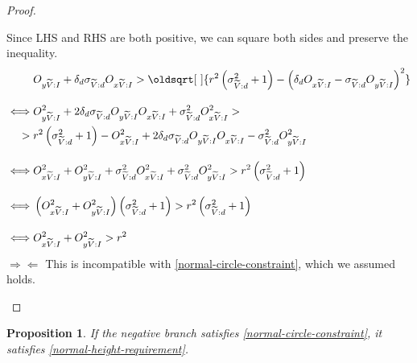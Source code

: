 \documentclass[a4paper,12pt]{article}
\newcommand{\contradiction}{\Rightarrow\!\Leftarrow}
\newcommand{\HSview}[1][V]{\widetilde{#1}}
\newcommand{\HSOx}[1][I]{O_{x\HSview:#1}}
\newcommand{\HSOy}[1][I]{O_{y\HSview:#1}}
\newcommand{\HSdelta}[1][d]{\delta_{#1}}
\newcommand{\HSsigma}[1][d]{\sigma_{\HSview:#1}}
\renewcommand*{\sqrt}[2][\ ]{\oldsqrt[#1]{#2} }
\newtheorem{proposition}[theorem]{Proposition}
\theoremstyle{definition}
\theoremstyle{plain}
\begin{document}
\begin{proof}
\begin{itemize}
				Since LHS and RHS are both positive, we can square both sides and preserve the inequality.
				\begin{align*}
					&\HSOy + \HSdelta\HSsigma\HSOx > \sqrt{r^2\left(\HSsigma^2 + 1\right) - \left(\HSdelta \HSOx - \HSsigma \HSOy\right)^2}\\[1em]
					\iff & \HSOy^2 + 2\HSdelta\HSsigma\HSOy\HSOx + \HSsigma^2\HSOx^2 >{}\\
					{}>{}& r^2\left(\HSsigma^2 + 1\right) - \HSOx^2 + 2\HSdelta\HSsigma\HSOy\HSOx - \HSsigma^2\HSOy^2\\[1em]
					\iff & \HSOx^2 + \HSOy^2 + \HSsigma^2\HSOx^2 + \HSsigma^2\HSOy^2 > r^2\left(\HSsigma^2 + 1\right)\\[1em]
					\iff & \left(\HSOx^2 + \HSOy^2\right)\left(\HSsigma^2 + 1\right) > r^2\left(\HSsigma^2 + 1\right)\\[1em]
					\iff & \HSOx^2 + \HSOy^2 > r^2
				\end{align*}
				$\contradiction$ This is incompatible with \eqref{normal-circle-constraint}, which we assumed holds.
		\end{itemize}

	\end{proof}

	\newpage
	
	\begin{proposition}
		If the negative branch satisfies \eqref{normal-circle-constraint}, it satisfies \eqref{normal-height-requirement}.
	\end{proposition}
\end{document}
